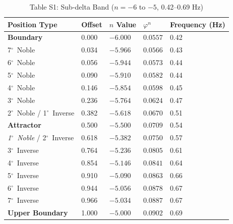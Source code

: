 \documentclass[11pt,a4paper]{article}
\newcommand{\degree}{$^\circ$}  %
\begin{document}
\begin{table}[H]
\centering
\caption*{Table S1: Sub-delta Band ($n = -6$ to $-5$, 0.42--0.69 Hz)}
\begin{tabular}{@{}lllll@{}}
\toprule
Position Type & Offset & $n$ Value & $\varphi^n$ & Frequency (Hz) \\
\midrule
\textbf{Boundary} & 0.000 & $-6.000$ & $0.0557$ & 0.42 \\
7\degree\ Noble & 0.034 & $-5.966$ & $0.0566$ & 0.43 \\
6\degree\ Noble & 0.056 & $-5.944$ & $0.0573$ & 0.44 \\
5\degree\ Noble & 0.090 & $-5.910$ & $0.0582$ & 0.44 \\
4\degree\ Noble & 0.146 & $-5.854$ & $0.0598$ & 0.45 \\
3\degree\ Noble & 0.236 & $-5.764$ & $0.0624$ & 0.47 \\
2\degree\ Noble / 1\degree\ Inverse & 0.382 & $-5.618$ & $0.0670$ & 0.51 \\
\textbf{Attractor} & 0.500 & $-5.500$ & $0.0709$ & 0.54 \\
\textit{1\degree\ Noble} / 2\degree\ Inverse & 0.618 & $-5.382$ & $0.0750$ & 0.57 \\
3\degree\ Inverse & 0.764 & $-5.236$ & $0.0805$ & 0.61 \\
4\degree\ Inverse & 0.854 & $-5.146$ & $0.0841$ & 0.64 \\
5\degree\ Inverse & 0.910 & $-5.090$ & $0.0863$ & 0.66 \\
6\degree\ Inverse & 0.944 & $-5.056$ & $0.0878$ & 0.67 \\
7\degree\ Inverse & 0.966 & $-5.034$ & $0.0887$ & 0.67 \\
\textbf{Upper Boundary} & 1.000 & $-5.000$ & $0.0902$ & 0.69 \\
\bottomrule
\end{tabular}
\end{table}
\end{document}
